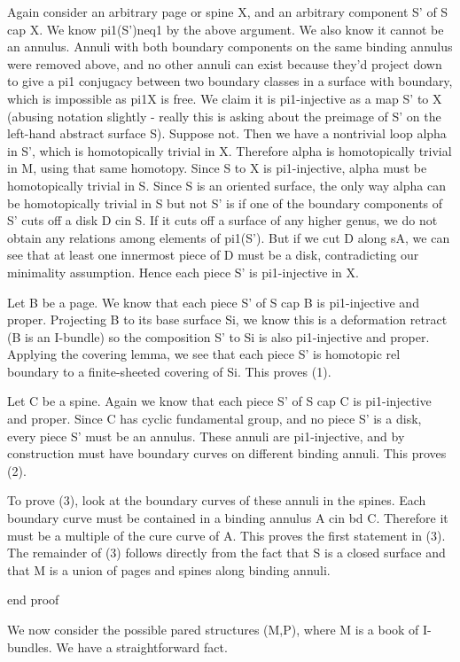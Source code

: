 Again consider an arbitrary page or spine X, and an arbitrary component S' of
S cap X.  We know pi1(S')neq1 by the above argument. We also know it cannot be
an annulus. Annuli with both boundary components on the same binding annulus
were removed above, and no other annuli can exist because they'd project down
to give a pi1 conjugacy between two boundary classes in a surface with
boundary, which is impossible as pi1X is free. We claim it is pi1-injective as
a map S' to X (abusing notation slightly - really this is asking about the
preimage of S' on the left-hand abstract surface S).  Suppose not. Then we have
a nontrivial loop alpha in S', which is homotopically trivial in X.  Therefore
alpha is homotopically trivial in M, using that same homotopy.  Since S to X is
pi1-injective, alpha must be homotopically trivial in S. Since S is an oriented
surface, the only way alpha can be homotopically trivial in S but not S' is if
one of the boundary components of S' cuts off a disk D cin S. If it cuts off
a surface of any higher genus, we do not obtain any relations among elements of
pi1(S'). But if we cut D along sA, we can see that at least one innermost piece
of D must be a disk, contradicting our minimality assumption. Hence each piece
S' is pi1-injective in X.

Let B be a page. We know that each piece S' of S cap B is pi1-injective and
proper. Projecting B to its base surface Si, we know this is a deformation
retract (B is an I-bundle) so the composition S' to Si is also pi1-injective
and proper. Applying the covering lemma, we see that each piece S' is homotopic
rel boundary to a finite-sheeted covering of Si. This proves (1).

Let C be a spine. Again we know that each piece S' of S cap C is pi1-injective
and proper. Since C has cyclic fundamental group, and no piece S' is a disk,
every piece S' must be an annulus. These annuli are pi1-injective, and by
construction must have boundary curves on different binding annuli.  This
proves (2).

To prove (3), look at the boundary curves of these annuli in the spines. Each
boundary curve must be contained in a binding annulus A cin bd C. Therefore it
must be a multiple of the cure curve of A. This proves the first statement in
(3). The remainder of (3) follows directly from the fact that S is a closed
surface and that M is a union of pages and spines along binding annuli.

end proof

We now consider the possible pared structures (M,P), where M is a book of
I-bundles. We have a straightforward fact.

